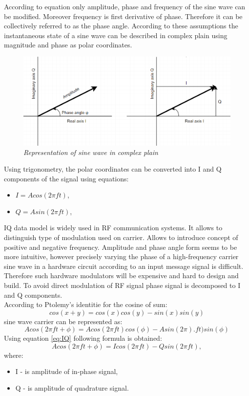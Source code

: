 \documentclass[en,printmode]{mgr}
\begin{document}
		According to equation \label{eq:sinewave} only amplitude, phase and frequency of the sine wave can be
		modified. Moreover frequency is first derivative of phase. Therefore it can be collectively referred to 
		as the phase angle. According to these assumptions the instantaneous state of a sine wave can be described
		in complex plain using magnitude and phase as polar coordinates.
		
		\begin{figure}[!htb]
    		\centering
   			\includegraphics[width=\textwidth]{plots/polarplots.png}
    		\caption{\textit{Representation of sine wave in complex plain}}
    		\label{fig:polarplot}
		\end{figure}
		
		\newpage
		Using trigonometry, the polar coordinates can be converted into I and Q components of the signal using
		equations:
		\begin{itemize}
			\item $I = A cos\left(2\pi f t\right)$, \label{eq:IQ}
			\item $Q = A sin\left(2\pi f t\right)$,
		\end{itemize}
		
		IQ data model is widely used in RF communication systems. It allows to distinguish type of modulation used 
		on carrier. Allows to introduce concept of positive and negative frequency. Amplitude and phase angle form
		seems to be more intuitive, however precisely varying the phase of a high-frequency carrier sine wave in a
		hardware circuit according to an input message signal is difficult. Therefore such hardware modulators will
		be expensive and hard to design and build. To avoid direct modulation of RF signal phase signal is decomposed
		to I and Q components.
		\\
		
		According to Ptolemy’s identitie for the cosine of sum:
		\[
			cos\left(x+y\right) = 
			cos\left(x\right)  cos\left(y\right) - sin\left(x\right) sin\left(y\right)
		\] 
		sine wave carrier can be represented as:
		\[
			Acos\left(2\pi ft + \phi\right) = 
			Acos\left(2\pi ft\right)cos\left(\phi\right) - Asin\left(2\pi\right). ft)sin(\phi)
		\]
		Using equation \ref{eq:IQ} following formula is obtained:
		\[
			Acos\left(2\pi ft + \phi\right) = 
			I cos\left(2\pi f t\right) - Q sin\left(2\pi f t\right),
		\]
		where:
		\begin{itemize}
			\item I - is amplitude of in-phase signal,
			\item Q - is amplitude of quadrature signal.
		\end{itemize}
		
\end{document}
